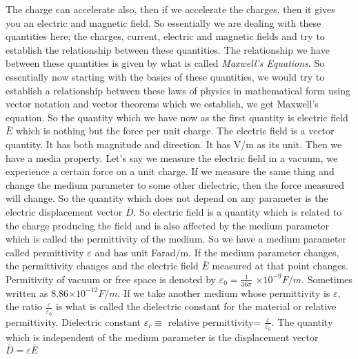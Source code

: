 The charge can accelerate also, then if we accelerate the charges, then it gives you an electric and magnetic field. So essentially we are dealing with these quantities here; the charges, current, electric and magnetic fields and try to establish the relationship between these quantities. The relationship we have between these quantities is given by what is called \emph{Maxwell's Equations}. So essentially now starting with the basics of these quantities, we would try to establish a relationship between these laws of physics in mathematical form using vector notation and vector theorems which we establish, we get Maxwell's equation. So the quantity which we have now as the first quantity is electric field $\bar{E}$ which is nothing but the force per unit charge. The electric field is a vector quantity. It has both magnitude and direction. It has V/m as its unit. Then we have a media property. Let's say we measure the electric field in a vacuum, we experience a certain force on a unit charge. If we measure the same thing and change the medium parameter to some other dielectric, then the force measured will change. So the quantity which does not depend on any parameter is the electric displacement vector $\bar{D}$.
So electric field is a quantity which is related to the charge producing the field and is also affected by the medium parameter which is called the permittivity of the medium. So we have a medium parameter called permittivity $\varepsilon$ and has unit Farad/m. If the medium parameter changes, the permittivity changes and the electric field $\bar{E}$ measured at that point changes. Permitivity of vacuum or free space is denoted by $\varepsilon_{0} =\frac{1}{36\pi}$ $\times 10^{-9}F/m$. Sometimes written as 8.86$\times10^{-12}F/m.$
If we take another medium whose permittivity is $\varepsilon$, the ratio $\frac{\varepsilon}{\varepsilon_{0}}$ is what is called the dielectric constant for the material or relative permittivity. 
Dielectric constant $\varepsilon_{r}\equiv$ relative permittivity= $\frac{\varepsilon}{\varepsilon_{0}}$.
The quantity which is independent of the medium parameter is the displacement vector $\bar{D}=\varepsilon \bar{E}$

